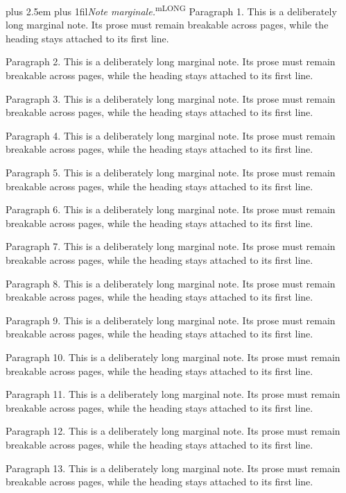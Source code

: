 \documentclass[11pt]{article}
\makeatletter
\newcommand\LMnotelabel{Note marginale}
\newcommand\LMsourceid{}
\newif\ifLMtrial
\newcommand\LMcurrentnoteref{}
\newcommand\LMgetnoteref{\directlua{LM.noteref("\luaescapestring{\LMsourceid}")}}
\newcommand\LMmarginstyle{\footnotesize\rightskip=0pt plus 2.5em\relax\parfillskip=0pt plus 1fil\relax\hyphenpenalty=50\relax\def\margin##1{{[##1]}}}
\newcommand\LMtrial[2]{%
 \LMtrialtrue\directlua{LM.measure=true LM.maxw=0}%
 \setbox\LMmbox\vbox{\hsize=#1\relax\@parboxrestore\LMmarginstyle #2\par}%
 \LMtrialfalse\directlua{LM.measure=false tex.setdimen("LMmw",LM.maxw)}%
 \LMmh=\dimexpr\ht\LMmbox+\dp\LMmbox\relax}
\newcommand\LMinblock[1]{%
 \directlua{LM.blocknotes=LM.blocknotes+1}%
 \par\smallskip\noindent{\color{gray}\rule{.20\linewidth}{.35pt}}\par\nobreak
 \begingroup\LMmarginstyle\parindent=0pt\noindent\textit{\LMnotelabel.}\enspace #1\par\endgroup\smallskip}
\newcommand\LMmargin[1]{\begingroup\LMgetnoteref
 \LMtrial{\marginparwidth}{#1}%
 \ifdim\LMmw>\marginparwidth\LMnotemark{\LMcurrentnoteref}\LMinblock{\textsuperscript{m\LMcurrentnoteref}\ #1}%
 \else\ifdim\LMmh>33pt\LMnotemark{\LMcurrentnoteref}\LMinblock{\textsuperscript{m\LMcurrentnoteref}\ #1}%
 \else\directlua{LM.shortnotes=LM.shortnotes+1}\marginpar{\LMmarginstyle #1}%
 \fi\fi\endgroup}
\newcommand\LMpendingnotes{}
\newcommand\LMnotemark[1]{\ifmmode{}^{\scriptscriptstyle\text{\color{gray}m#1}}\else\textsuperscript{\color{gray}m#1}\fi}
\newcommand\LMqueuenote[1]{%
 \LMgetnoteref\LMnotemark{\LMcurrentnoteref}%
 \ifnum\LMnotefresh=1\begingroup\edef\LMnext{\endgroup\noexpand\g@addto@macro\noexpand\LMpendingnotes{\noexpand\LMqueuednote{\LMcurrentnoteref}{\the\LMattr}{\unexpanded{#1}}}}\LMnext\fi}
\newcommand\LMqueuednote[3]{\begingroup\LMattr=#2\relax\ifnum#2>0\color{blue}\fi\LMinblock{\textsuperscript{m#1}\ #3}\endgroup}
\newcommand\margin[1]{\ifmmode\LMqueuenote{\(#1\)}\else\ifinner\LMqueuenote{#1}\else\LMmargin{#1}\fi\fi}
\makeatother
\begin{document}
\LMinblock{\textsuperscript{mLONG} Paragraph 1. This is a deliberately long marginal note. Its prose must remain breakable across pages, while the heading stays attached to its first line.\par
Paragraph 2. This is a deliberately long marginal note. Its prose must remain breakable across pages, while the heading stays attached to its first line.\par
Paragraph 3. This is a deliberately long marginal note. Its prose must remain breakable across pages, while the heading stays attached to its first line.\par
Paragraph 4. This is a deliberately long marginal note. Its prose must remain breakable across pages, while the heading stays attached to its first line.\par
Paragraph 5. This is a deliberately long marginal note. Its prose must remain breakable across pages, while the heading stays attached to its first line.\par
Paragraph 6. This is a deliberately long marginal note. Its prose must remain breakable across pages, while the heading stays attached to its first line.\par
Paragraph 7. This is a deliberately long marginal note. Its prose must remain breakable across pages, while the heading stays attached to its first line.\par
Paragraph 8. This is a deliberately long marginal note. Its prose must remain breakable across pages, while the heading stays attached to its first line.\par
Paragraph 9. This is a deliberately long marginal note. Its prose must remain breakable across pages, while the heading stays attached to its first line.\par
Paragraph 10. This is a deliberately long marginal note. Its prose must remain breakable across pages, while the heading stays attached to its first line.\par
Paragraph 11. This is a deliberately long marginal note. Its prose must remain breakable across pages, while the heading stays attached to its first line.\par
Paragraph 12. This is a deliberately long marginal note. Its prose must remain breakable across pages, while the heading stays attached to its first line.\par
Paragraph 13. This is a deliberately long marginal note. Its prose must remain breakable across pages, while the heading stays attached to its first line.\par
}
\end{document}
